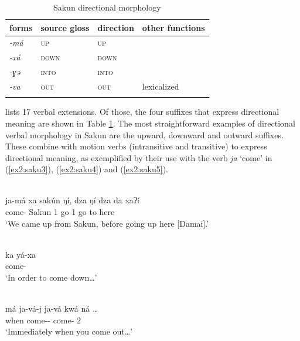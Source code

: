 \begin{table}[H]
\caption{Sakun directional morphology}
\label{tab:saku}
\begin{tabular}{llll} %
	\lsptoprule
	forms & source gloss & direction  & other functions  \\ %
	\midrule
	\textit{-má}  &  \textsc{up}  &    \textsc{up} &   \\
	\textit{-xá}  &  \textsc{down}  &   \textsc{down}  &    \\
	\textit{-ɣə}  &  \textsc{into}  &   \textsc{into}   &     \\
	\textit{-va}  &  \textsc{out}  &   \textsc{out}   &   lexicalized  \\
	\lspbottomrule
\end{tabular}
\end{table} 

\citet[120]{thomasGrammarSakunSukur2014} lists 17 verbal extensions. Of those, the four suffixes that express directional meaning are shown in Table \ref{tab:saku}. The most straightforward examples of directional verbal morphology in Sakun are the upward, downward and outward suffixes. These combine with motion verbs (intransitive and transitive) to express directional meaning, as exemplified by their use with the verb \textit{ja} `come' in (\ref{ex2:saku3}), (\ref{ex2:saku4}) and (\ref{ex2:saku5}).

\ea\label{ex2:saku3}
 \\
\gll  ja-má xa sakún ŋí, dza ŋí dza da xaʔí \\
come-  Sakun 1 go 1 go to here \\
\glt `We came up from Sakun, before going up here [Damai].'

\ex\label{ex2:saku4}
 \\
\gll ka yá-xa	\\
 come- \\
\glt `In order to come down…'

\ex\label{ex2:saku5}
 \\
\gll má ja-vá-j ja-vá kwá ná … \\
when come-- come- 2  \\
\glt `Immediately when you come out…'
\z 

